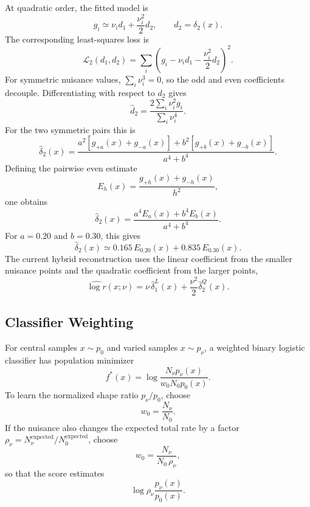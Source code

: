 \documentclass[11pt]{article}
\begin{document}
At quadratic order, the fitted model is
\begin{equation}
  g_i \simeq \nu_i d_1+\frac{\nu_i^2}{2}d_2,
  \qquad d_2=\delta_2(x).
\end{equation}
The corresponding least-squares loss is
\begin{equation}
  \mathcal{L}_2(d_1,d_2)
  =\sum_i
  \left(g_i-\nu_i d_1-\frac{\nu_i^2}{2}d_2\right)^2.
\end{equation}
For symmetric nuisance values, $\sum_i\nu_i^3=0$, so the odd and even
coefficients decouple. Differentiating with respect to $d_2$ gives
\begin{equation}
  \widehat{d}_2
  =\frac{2\sum_i \nu_i^2 g_i}{\sum_i \nu_i^4}.
\end{equation}
For the two symmetric pairs this is
\begin{equation}
  \widehat{\delta}_2(x)
  =
  \frac{
    a^2[g_{+a}(x)+g_{-a}(x)]
    +b^2[g_{+b}(x)+g_{-b}(x)]
  }{a^4+b^4}.
\end{equation}
Defining the pairwise even estimate
\begin{equation}
  E_h(x)=\frac{g_{+h}(x)+g_{-h}(x)}{h^2},
\end{equation}
one obtains
\begin{equation}
  \widehat{\delta}_2(x)
  =\frac{a^4 E_a(x)+b^4 E_b(x)}{a^4+b^4}.
\end{equation}
For $a=0.20$ and $b=0.30$, this gives
\begin{equation}
  \widehat{\delta}_2(x)
  \simeq 0.165\,E_{0.20}(x)+0.835\,E_{0.30}(x).
\end{equation}
The current hybrid reconstruction uses the linear coefficient from the smaller
nuisance points and the quadratic coefficient from the larger points,
\begin{equation}
  \widehat{\log r}(x;\nu)
  =\nu\,\widehat{\delta}_1^{L}(x)
  +\frac{\nu^2}{2}\widehat{\delta}_2^{Q}(x).
\end{equation}

\subsection{Classifier Weighting}

For central samples $x\sim p_0$ and varied samples $x\sim p_\nu$, a weighted
binary logistic classifier has population minimizer
\begin{equation}
  f^*(x)=
  \log \frac{N_\nu p_\nu(x)}
            {w_0 N_0 p_0(x)}.
\end{equation}
To learn the normalized shape ratio $p_\nu/p_0$, choose
\begin{equation}
  w_0 = \frac{N_\nu}{N_0}.
\end{equation}
If the nuisance also changes the expected total rate by a factor
$\rho_\nu=N_\nu^{\mathrm{expected}}/N_0^{\mathrm{expected}}$, choose
\begin{equation}
  w_0 = \frac{N_\nu}{N_0\,\rho_\nu},
\end{equation}
so that the score estimates
\begin{equation}
  \log \rho_\nu \frac{p_\nu(x)}{p_0(x)}.
\end{equation}
\end{document}
